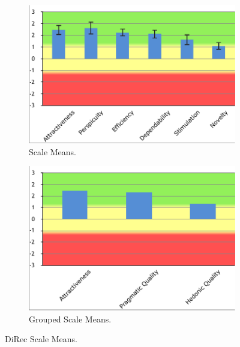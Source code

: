 \begin{figure}[!htpb]
\centering
\begin{subfigure}[b]{0.45\textwidth}
\includegraphics[width=\textwidth]{figures/direc-results}
\caption{Scale Means.}
\label{fig:figure516a}
\end{subfigure}
\begin{subfigure}[b]{0.45\textwidth}
\includegraphics[width=\textwidth]{figures/direc-results2}
\caption{Grouped Scale Means.}
\label{fig:figure516b}
\end{subfigure}
\caption{DiRec Scale Means.}
\label{fig:figure516}
\end{figure}

